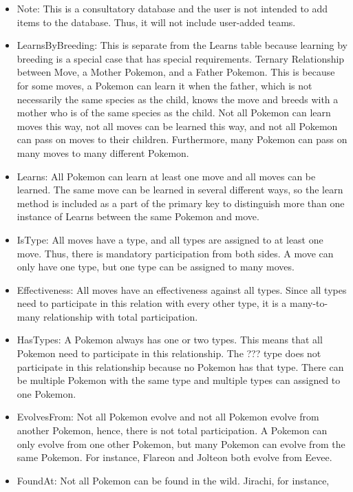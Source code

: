\documentclass{article}
\begin{document}
\begin{itemize}
	\item Note:
		This is a consultatory database and the user is not intended to add items to the database.
		Thus, it will not include user-added teams.
	\item LearnsByBreeding:
		This is separate from the Learns table because learning by breeding is a special case
		that has special requirements.
		Ternary Relationship between Move, a Mother Pokemon, and a Father Pokemon.
		This is because for some moves, a Pokemon can learn it when the father,
		which is not necessarily the same species as the child, knows the move and breeds
		with a mother who is of the same species as the child.
		Not all Pokemon can learn moves this way, not all moves can be learned this way, 
		and not all Pokemon can pass on moves to their children.
		Furthermore, many Pokemon can pass on many moves to many different Pokemon.
	\item Learns:
		All Pokemon can learn at least one move and all moves can be learned.
		The same move can be learned in several different ways, so the learn method
		is included as a part of the primary key to distinguish more than one 
		instance of Learns between the same Pokemon and move.
	\item IsType: 
		All moves have a type, and all types are assigned to at least one move.
		Thus, there is mandatory participation from both sides.
		A move can only have one type, but one type can be assigned to many moves.
	\item Effectiveness:
		All moves have an effectiveness against all types.
		Since all types need to participate in this relation with every other type,
		it is a many-to-many relationship with total participation.
	\item HasTypes:
		A Pokemon always has one or two types. This means that all Pokemon need to participate
		in this relationship. The ??? type does not participate in this relationship
		because no Pokemon has that type. There can be multiple Pokemon
		with the same type and multiple types can assigned to one Pokemon.
	\item EvolvesFrom:
		Not all Pokemon evolve and not all Pokemon evolve from another Pokemon,
		hence, there is not total participation.
		A Pokemon can only evolve from one other Pokemon,
		but many Pokemon can evolve from the same Pokemon.
		For instance, Flareon and Jolteon both evolve from Eevee.
	\item FoundAt:
		Not all Pokemon can be found in the wild. Jirachi, for instance,

\end{itemize}
\end{document}
